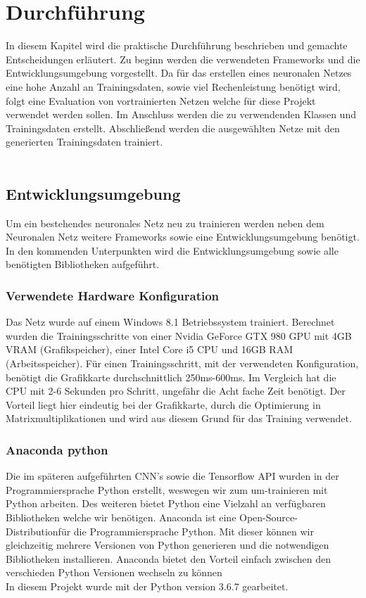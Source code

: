 \documentclass[a4paper,12pt,oneside]{article}
\begin{document}
\newpage

  \section{Durchführung}
In diesem Kapitel wird die praktische Durchführung beschrieben und gemachte Entscheidungen erläutert. Zu beginn werden die verwendeten Frameworks und die Entwicklungsumgebung vorgestellt. Da für das erstellen eines neuronalen Netzes eine hohe Anzahl an Trainingsdaten, sowie viel Rechenleistung benötigt wird, folgt eine Evaluation von vortrainierten Netzen welche für diese Projekt verwendet werden sollen. Im Anschluss werden die zu verwendenden Klassen und Trainingsdaten erstellt. Abschließend werden die ausgewählten Netze mit den generierten Trainingsdaten trainiert. \\
\\

\subsection{Entwicklungsumgebung}
Um ein bestehendes neuronales Netz neu zu trainieren werden neben dem Neuronalen Netz weitere Frameworks sowie eine Entwicklungsumgebung benötigt. In den kommenden Unterpunkten wird die Entwicklungsumgebung sowie alle benötigten Bibliotheken aufgeführt. 

  \subsubsection{Verwendete Hardware Konfiguration}
  \label{konfiguration}
Das Netz wurde auf einem Windows 8.1 Betriebssystem trainiert. Berechnet wurden die Trainingsschritte von einer Nvidia GeForce GTX 980 GPU mit 4GB VRAM (Grafikspeicher), einer Intel Core i5 CPU und 16GB RAM (Arbeitsspeicher). Für einen Trainingsschritt, mit der verwendeten Konfiguration, benötigt die Grafikkarte durchschnittlich 250ms-600ms. Im Vergleich hat die CPU mit 2-6 Sekunden pro Schritt, ungefähr die Acht fache Zeit benötigt. Der Vorteil liegt hier eindeutig bei der Grafikkarte, durch die Optimierung in Matrixmultiplikationen und wird aus diesem Grund für das Training verwendet.

  \subsubsection{Anaconda python}
Die im späteren aufgeführten CNN's sowie die Tensorflow API wurden in der Programmiersprache Python erstellt, weswegen wir zum um-trainieren mit Python arbeiten. Des weiteren bietet Python eine Vielzahl an verfügbaren Bibliotheken welche wir benötigen. Anaconda \cite{conda2018} ist eine \glqq Open-Source-Distribution\grqq für die Programmiersprache Python. Mit dieser können wir gleichzeitig mehrere Versionen von Python generieren und die notwendigen Bibliotheken installieren. Anaconda bietet den Vorteil einfach zwischen den verschieden Python Versionen wechseln zu können \\
In diesem Projekt wurde mit der Python version 3.6.7 gearbeitet.
\end{document}
